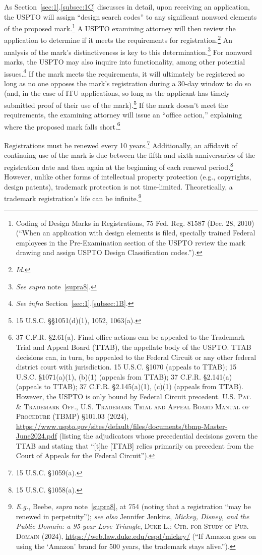 \documentclass[letterpaper, 11pt, oneside]{article}
\begin{document}
As Section~\ref{sec:1}.\ref{subsec:1C} discusses in detail, upon receiving an application, the USPTO will assign ``design search codes'' to any significant nonword elements of the proposed mark.\footnote{\label{supra10} Coding of Design Marks in Registrations, 75 Fed. Reg. 81587 (Dec. 28, 2010) (``When an application with design elements is filed, specially trained Federal employees in the Pre-Examination section of the USPTO review the mark drawing and assign USPTO Design Classification codes.'').} A USPTO examining attorney will then review the application to determine if it meets the requirements for registration.\footnote{\textit{Id.}} An analysis of the mark's distinctiveness is key to this determination.\footnote{\textit{See supra} note~\ref{supra8}.} For nonword marks, the USPTO may also inquire into functionality, among other potential issues.\footnote{\textit{See infra} Section~\ref{sec:1}.\ref{subsec:1B}.} If the mark meets the requirements, it will ultimately be registered so long as no one opposes the mark's registration during a 30-day window to do so (and, in the case of ITU applications, so long as the applicant has timely submitted proof of their use of the mark).\footnote{15 U.S.C. \S\S 1051(d)(1), 1052, 1063(a).} If the mark doesn't meet the requirements, the examining attorney will issue an ``office action,'' explaining where the proposed mark falls short.\footnote{37 C.F.R. \S 2.61(a). Final office actions can be appealed to the Trademark Trial and Appeal Board (TTAB), the appellate body of the USPTO. TTAB decisions can, in turn, be appealed to the Federal Circuit or any other federal district court with jurisdiction. 15 U.S.C. \S 1070 (appeals to TTAB); 15 U.S.C. \S 1071(a)(1), (b)(1) (appeals from TTAB); 37 C.F.R. \S 2.141(a) (appeals to TTAB); 37 C.F.R. \S 2.145(a)(1), (c)(1) (appeals from TTAB). However, the USPTO is only bound by Federal Circuit precedent. \textsc{U.S. Pat. \& Trademark Off., U.S. Trademark Trial and Appeal Board Manual of Procedure (TBMP)} \S 101.03 (2024), \url{https://www.uspto.gov/sites/default/files/documents/tbmp-Master-June2024.pdf} (listing the adjudicators whose precedential decisions govern the TTAB and stating that ``[t]he [TTAB] relies primarily on precedent from the Court of Appeals for the Federal Circuit'').}

Registrations must be renewed every 10 years.\footnote{15 U.S.C. \S 1059(a).} Additionally, an affidavit of continuing use of the mark is due between the fifth and sixth anniversaries of the registration date and then again at the beginning of each renewal period.\footnote{15 U.S.C. \S 1058(a).} However, unlike other forms of intellectual property protection (e.g., copyrights, design patents), trademark protection is not time-limited. Theoretically, a trademark registration's life can be infinite.\footnote{\textit{E.g.}, Beebe, \textit{supra} note~\ref{supra8}, at 754 (noting that a registration ``may be renewed in perpetuity''); \textit{see also} Jennifer Jenkins, \textit{Mickey, Disney, and the Public Domain: a 95-year Love Triangle}, \textsc{Duke L.: Ctr. for Study of Pub. Domain} (2024), \url{https://web.law.duke.edu/cspd/mickey/} (``If Amazon goes on using the `Amazon' brand for 500 years, the trademark stays alive.'').} 
\end{document}
